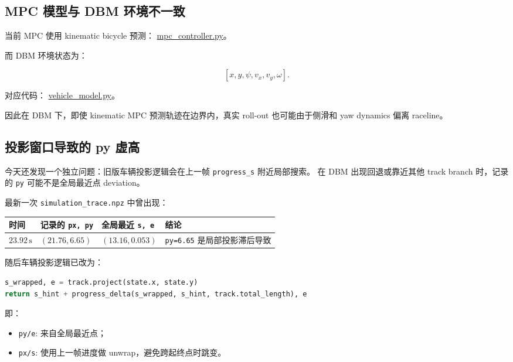 \documentclass[UTF8]{ctexart}
\begin{document}
\subsection{MPC 模型与 DBM 环境不一致}

当前 MPC 使用 kinematic bicycle 预测：
\href{https://github.com/CrazalDaver/racer-LLM/blob/main/mpc_controller.py}{mpc\_controller.py}。

而 DBM 环境状态为：

\[
[x,y,\psi,v_x,v_y,\omega].
\]

对应代码：
\href{https://github.com/CrazalDaver/racer-LLM/blob/main/vehicle_model.py}{vehicle\_model.py}。

因此在 DBM 下，即使 kinematic MPC 预测轨迹在边界内，真实 roll-out 也可能由于侧滑和 yaw dynamics 偏离 raceline。

\subsection{投影窗口导致的 py 虚高}

今天还发现一个独立问题：旧版车辆投影逻辑会在上一帧 \texttt{progress\_s} 附近局部搜索。
在 DBM 出现回退或靠近其他 track branch 时，记录的 \texttt{py} 可能不是全局最近点 deviation。

最新一次 \texttt{simulation\_trace.npz} 中曾出现：

\begin{center}
\begin{tabular}{llll}
\toprule
时间 & 记录的 \texttt{px, py} & 全局最近 \texttt{s, e} & 结论 \\
\midrule
$23.92\,\mathrm{s}$ & $(21.76, 6.65)$ & $(13.16, 0.053)$ & \texttt{py=6.65} 是局部投影滞后导致 \\
\bottomrule
\end{tabular}
\end{center}

随后车辆投影逻辑已改为：

\begin{lstlisting}[language=Python]
s_wrapped, e = track.project(state.x, state.y)
return s_hint + progress_delta(s_wrapped, s_hint, track.total_length), e
\end{lstlisting}

即：

\begin{itemize}
  \item \texttt{py/e}: 来自全局最近点；
  \item \texttt{px/s}: 使用上一帧进度做 unwrap，避免跨起终点时跳变。
\end{itemize}
\end{document}
